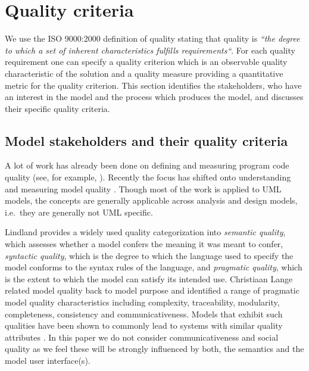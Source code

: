 \section{Quality criteria}
\label{sec:qualityCriteria}

We use the ISO 9000:2000 \cite{hoyle_iso_2000} definition of quality stating that quality is \emph{``the degree to which a set of inherent characteristics fulfills requirements``}. For each quality requirement one can specify a quality criterion which is an observable quality characteristic of the solution and a quality measure providing a quantitative metric for the quality criterion\cite{firesmith_quality_2005}. This section identifies the stakeholders, who have an interest in the model and the process which produces the model, and discusses their specific quality criteria.


\subsection{Model stakeholders and their quality criteria}
\label{sec:modelStakeholdersAndQualityRequirements}

A lot of work has already been done on defining and measuring program code quality (see, for example, \cite{boehm_barry_w._characteristics_1978}). Recently the focus has shifted onto understanding and measuring model quality \cite{lange_managing_2005,lange_improving_2006,shim_design_2008,qi_yu-dong_analysis_2010}. Though most of the work is applied to UML models, the concepts are generally applicable across analysis and design models, i.e.\ they are generally not UML specific. 

Lindland\cite{lindland_understanding_1994} provides a widely used quality categorization into \emph{semantic quality}, which assesses whether a model confers the meaning it was meant to confer, \emph{syntactic quality}, which is the degree to which the language used to specify the model conforms to the syntax rules of the language, and \emph{pragmatic quality}, which is the extent to which the model can satisfy its intended use. Christiaan Lange  \cite{lange_christiaan_assessing_2007} related model quality back to model purpose and identified a range of pragmatic model quality characteristics including complexity, traceability, modularity, completeness, consistency and communicativeness. Models that exhibit such qualities have been shown to commonly lead to systems with similar quality attributes \cite{podgorelec_estimating_2007}. In this paper we do not consider communicativeness and social quality as we feel these will be strongly influenced by both, the semantics and the model user interface(s).

